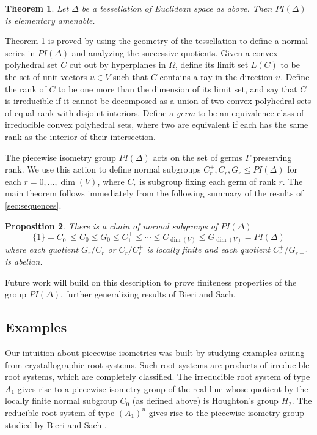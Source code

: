 \documentclass[11pt]{amsart}
\newtheorem{theorem}{Theorem}[section]
\newtheorem{prop}[theorem]{Proposition}
\numberwithin{table}{section}
\numberwithin{figure}{section}
\theoremstyle{remark}
\begin{document}
\begin{theorem} \label{thm:elem-amen} Let $\Delta$ be a tessellation
  of Euclidean space as above. Then $PI(\Delta)$ is elementary
  amenable.
\end{theorem}

Theorem \ref{thm:elem-amen} is proved by using the geometry of the
tessellation to define a normal series in $PI(\Delta)$ and analyzing
the successive quotients. Given a convex polyhedral set $C$ cut out by
hyperplanes in $\Omega$, define its limit set $L(C)$ to be the set of
unit vectors $u\in V$ such that $C$ contains a ray in the direction
$u$. Define the rank of $C$ to be one more than the dimension of its
limit set, and say that $C$ is irreducible if it cannot be decomposed
as a union of two convex polyhedral sets of equal rank with disjoint
interiors. Define a {\em germ} to be an equivalence class of
irreducible convex polyhedral sets, where two are equivalent if each
has the same rank as the interior of their intersection.

The piecewise isometry group $PI(\Delta)$ acts on the set of germs
$\Gamma$ preserving rank. We use this action to define normal
subgroups $C_r^+, C_r, G_r \leq PI(\Delta)$ for each
$r=0,\dotsc, \dim(V)$, where $C_r$ is subgroup fixing each germ of
rank $r$. The main theorem follows immediately from the following
summary of the results of \cref{sec:sequences}.

\begin{prop} \label{prop:introchain}
  There is a chain of normal subgroups of $PI(\Delta)$
  \[
    \{1\} = C_0^+ \leq C_0 \leq G_0 \leq C_1^+ \leq \dotsb \leq
    C_{\dim(V)} \leq G_{\dim(V)} = PI(\Delta)
  \]
  where each quotient $G_r/C_r$ or $C_r/C_r^+$ is locally finite and
  each quotient $C_r^+/G_{r-1}$ is abelian.
\end{prop}

Future work will build on this description to prove finiteness
properties of the group $PI(\Delta)$, further generalizing results of
Bieri and Sach.

\subsection{Examples}

Our intuition about piecewise isometries was built by studying
examples arising from crystallographic root systems. Such root systems
are products of irreducible root systems, which are completely
classified. The irreducible root system of type $A_1$ gives rise to a
piecewise isometry group of the real line whose quotient by the
locally finite normal subgroup $C_0$ (as defined above) is Houghton's
group $H_2$. The reducible root system of type $(A_1)^n$ gives rise to
the piecewise isometry group studied by Bieri and Sach \cite{BS22}.
\end{document}
